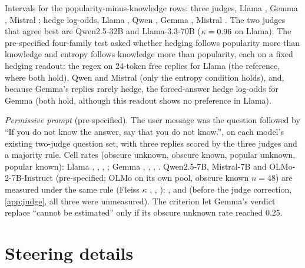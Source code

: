 \documentclass{article}
\begin{document}
Intervals for the popularity-minus-knowledge rows: three judges, Llama \tjLlamaDiffCI, Gemma \tjGemmaDiffCI, Mistral \tjMistralDiffCI; hedge log-odds, Llama \loLlamaDiffCI, Qwen \loQwenDiffCI, Gemma \loGemmaDiffCI, Mistral \loMistralDiffCI. The two judges that agree best are Qwen2.5-32B and Llama-3.3-70B ($\kappa=0.96$ on Llama). The pre-specified four-family test asked whether hedging follows popularity more than knowledge and entropy follows knowledge more than popularity, each on a fixed hedging readout: the regex on 24-token free replies for Llama (the reference, where both hold), Qwen and Mistral (only the entropy condition holds), and, because Gemma's replies rarely hedge, the forced-answer hedge log-odds for Gemma (both hold, although this readout shows no preference in Llama).

\emph{Permissive prompt} (pre-specified). The user message was the question followed by ``If you do not know the answer, say that you do not know.'', on each model's existing two-judge question set, with three replies scored by the three judges and a majority rule. Cell rates (obscure unknown, obscure known, popular unknown, popular known): Llama \pmLlamaObsUnk, \pmLlamaObsKnown, \pmLlamaPopUnk, \pmLlamaPopKnown; Gemma \pmGemmaObsUnk, \pmGemmaObsKnown, \pmGemmaPopUnk, \pmGemmaPopKnown. Qwen2.5-7B, Mistral-7B and OLMo-2-7B-Instruct (pre-specified; OLMo on its own pool, obscure known $n=48$) are measured under the same rule (Fleiss $\kappa$ \pmQwenKappa, \pmMistralKappa, \pmOlmoKappa): \pmQwenDiff{} \pmQwenDiffCI, \pmMistralDiff{} \pmMistralDiffCI{} and \pmOlmoDiff{} \pmOlmoDiffCI{} (before the judge correction, \cref{app:judge}, all three were unmeasured). The criterion let Gemma's verdict replace ``cannot be estimated'' only if its obscure unknown rate reached 0.25.

\section{Steering details}
\label{app:steer}
\end{document}
